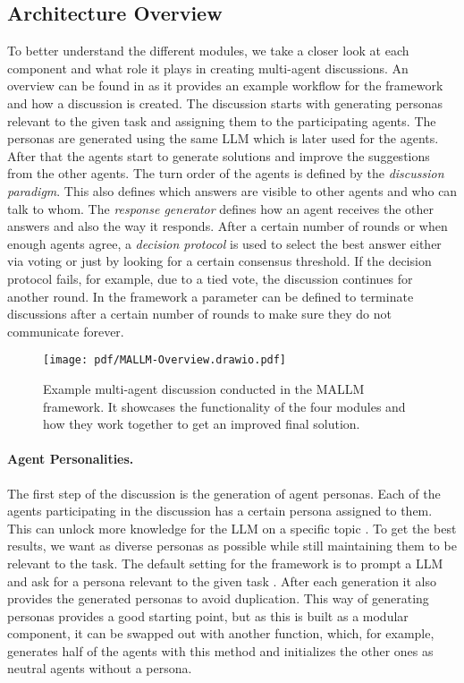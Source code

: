 \subsection{Architecture Overview}
\label{sec:architecture}
To better understand the different modules, we take a closer look at each component and what role it plays in creating multi-agent discussions. An overview can be found in  as it provides an example workflow for the framework and how a discussion is created. The discussion starts with generating personas relevant to the given task and assigning them to the participating agents. The personas are generated using the same \ac{LLM} which is later used for the agents. After that the agents start to generate solutions and improve the suggestions from the other agents. The turn order of the agents is defined by the \textit{discussion paradigm}. This also defines which answers are visible to other agents and who can talk to whom. The \textit{response generator} defines how an agent receives the other answers and also the way it responds. After a certain number of rounds or when enough agents agree, a \textit{decision protocol} is used to select the best answer either via voting or just by looking for a certain consensus threshold. If the decision protocol fails, for example, due to a tied vote, the discussion continues for another round. In the framework a parameter can be defined to terminate discussions after a certain number of rounds to make sure they do not communicate forever.

\begin{figure*}
    \centering
    \texttt{[image: pdf/MALLM-Overview.drawio.pdf]}
    \caption{Example multi-agent discussion conducted in the \ac{MALLM} framework. It showcases the functionality of the four modules and how they work together to get an improved final solution.}
    \label{fig:mallm_overview}
\end{figure*}

\paragraph{Agent Personalities.}
The first step of the discussion is the generation of agent personas. Each of the agents participating in the discussion has a certain persona assigned to them. This can unlock more knowledge for the \ac{LLM} on a specific topic \citep{kim_persona_2024}. To get the best results, we want as diverse personas as possible while still maintaining them to be relevant to the task. The default setting for the framework is to prompt a \ac{LLM} and ask for a persona relevant to the given task \citep{wang_unleashing_2024}. After each generation it also provides the generated personas to avoid duplication. This way of generating personas provides a good starting point, but as this is built as a modular component, it can be swapped out with another function, which, for example, generates half of the agents with this method and initializes the other ones as neutral agents without a persona.
